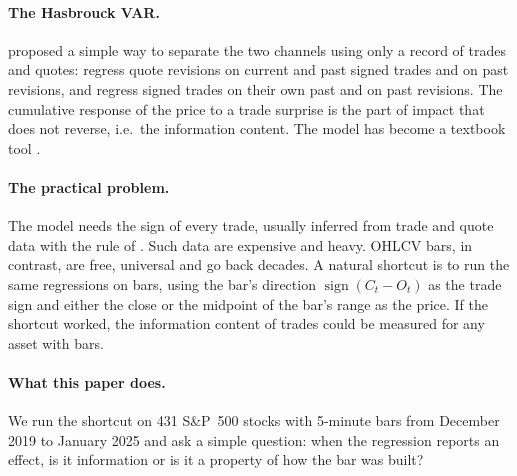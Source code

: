 \documentclass[11pt,a4paper]{article}
\begin{document}
\paragraph{The Hasbrouck VAR.} \citet{hasbrouck1991} proposed a simple way to separate the two channels
using only a record of trades and quotes: regress quote revisions on current and past signed trades
and on past revisions, and regress signed trades on their own past and on past revisions. The
cumulative response of the price to a trade surprise is the part of impact that does not reverse, i.e.\
the information content. The model has become a textbook tool \citep{hasbrouck2007}.

\paragraph{The practical problem.} The model needs the sign of every trade, usually inferred from
trade and quote data with the rule of \citet{lee1991}. Such data are expensive and heavy. OHLCV bars,
in contrast, are free, universal and go back decades. A natural shortcut is to run the same
regressions on bars, using the bar's direction $\operatorname{sign}(C_t-O_t)$ as the trade sign and
either the close or the midpoint of the bar's range as the price. If the shortcut worked, the
information content of trades could be measured for any asset with bars.

\paragraph{What this paper does.} We run the shortcut on 431 S\&P~500 stocks with 5-minute bars
from December 2019 to January 2025 and ask a simple question: when the regression reports an effect,
is it information or is it a property of how the bar was built?
\end{document}

